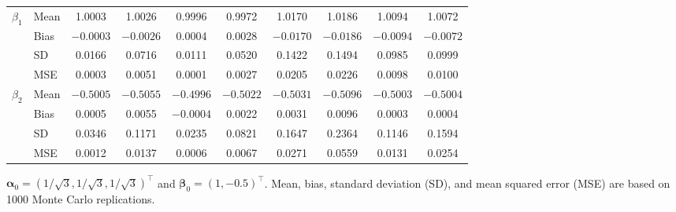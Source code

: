 \begin{table}[ht!]
\begin{threeparttable}
\begin{tabular}{llcccccccc}
\multirow{4}{*}{$\beta_{1}$}
& Mean & 1.0003 & 1.0026 & 0.9996 & 0.9972 & 1.0170 & 1.0186 & 1.0094 & 1.0072 \\
& Bias & $-0.0003$ & $-0.0026$ & 0.0004 & 0.0028 & $-0.0170$ & $-0.0186$ & $-0.0094$ & $-0.0072$ \\
& SD   & 0.0166 & 0.0716 & 0.0111 & 0.0520 & 0.1422 & 0.1494 & 0.0985 & 0.0999 \\
& MSE  & 0.0003 & 0.0051 & 0.0001 & 0.0027 & 0.0205 & 0.0226 & 0.0098 & 0.0100 \\
\midrule

\multirow{4}{*}{$\beta_{2}$}
& Mean & $-0.5005$ & $-0.5055$ & $-0.4996$ & $-0.5022$ & $-0.5031$ & $-0.5096$ & $-0.5003$ & $-0.5004$ \\
& Bias & 0.0005 & 0.0055 & $-0.0004$ & 0.0022 & 0.0031 & 0.0096 & 0.0003 & 0.0004 \\
& SD   & 0.0346 & 0.1171 & 0.0235 & 0.0821 & 0.1647 & 0.2364 & 0.1146 & 0.1594 \\
& MSE  & 0.0012 & 0.0137 & 0.0006 & 0.0067 & 0.0271 & 0.0559 & 0.0131 & 0.0254 \\

\bottomrule
\end{tabular}

\begin{tablenotes}
\footnotesize
\item $\boldsymbol{\alpha}_0=(1/\sqrt{3},1/\sqrt{3},1/\sqrt{3})^\top$ and 
$\boldsymbol{\beta}_0=(1,-0.5)^\top$. Mean, bias, standard deviation (SD), and mean squared error (MSE) are based on 1000 Monte Carlo replications.
\end{tablenotes}
\end{threeparttable}
\end{table}

